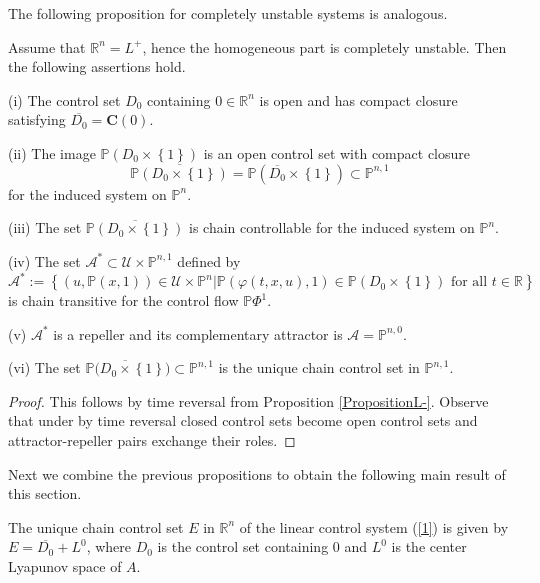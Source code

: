 \documentclass{siamltex}%
\begin{document}
The following proposition for completely unstable systems is analogous.

\begin{proposition}
\label{PropositionL+}Assume that $\mathbb{R}^{n}=L^{+}$, hence the homogeneous
part is completely unstable. Then the following assertions hold.

(i) The control set $D_{0}$ containing \thinspace$0\in\mathbb{R}^{n}$ is open
and has compact closure satisfying $\overline{D_{0}}=\mathbf{C}(0)$.

(ii) The image $\mathbb{P}(D_{0}\times\left\{  1\right\}  )$ is an open
control set with compact closure%
\[
\overline{\mathbb{P}(D_{0}\times\left\{  1\right\}  )}=\mathbb{P}%
(\overline{D_{0}}\times\left\{  1\right\}  )\subset\mathbb{P}^{n,1}%
\]
for the induced system on $\mathbb{P}^{n}$.

(iii) The set $\overline{\mathbb{P}\left(  D_{0}\times\left\{  1\right\}
\right)  }$ is chain controllable for the induced system on $\mathbb{P}^{n}$.

(iv) The set $\mathcal{A}^{\ast}\subset\mathcal{U}\times\mathbb{P}^{n,1}$
defined by%
\[
\mathcal{A}^{\ast}:=\left\{  (u,\mathbb{P}(x,1))\in\mathcal{U}\times
\mathbb{P}^{n}\left\vert \mathbb{P}(\varphi(t,x,u),1)\in\mathbb{P}(D_{0}%
\times\left\{  1\right\}  )\text{ for all }t\in\mathbb{R}\right.  \right\}
\]
is chain transitive for the control flow $\mathbb{P}\Phi^{1}$.

(v) $\mathcal{A}^{\ast}$ is a repeller and its complementary attractor is
$\mathcal{A}=\mathbb{P}^{n,0}$.

(vi) The set $\overline{\mathbb{P}(D_{0}\times\left\{  1\right\}  }%
)\subset\mathbb{P}^{n,1}$ is the unique chain control set in $\mathbb{P}%
^{n,1}$.
\end{proposition}

\begin{proof}
This follows by time reversal from Proposition \ref{PropositionL-}. Observe
that under by time reversal closed control sets become open control sets and
attractor-repeller pairs exchange their roles.
\end{proof}

Next we combine the previous propositions to obtain the following main result
of this section.

\begin{theorem}
\label{Theorem_ccs1}The unique chain control set $E$ in $\mathbb{R}^{n}$ of
the linear control system (\ref{1}) is given by $E=\overline{D_{0}}+L^{0}$,
where $D_{0}$ is the control set containing $0$ and $L^{0}$ is the center
Lyapunov space of $A$.
\end{theorem}
\end{document}
